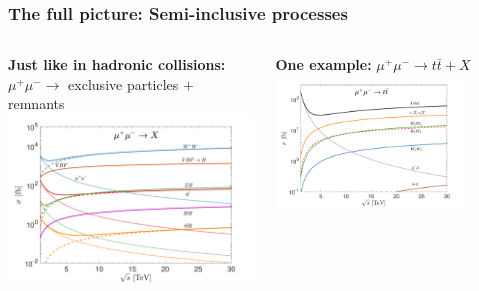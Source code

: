 \documentclass[aspectratio=169]{beamer}
\begin{document}
\begin{frame}
    \frametitle{The full picture: Semi-inclusive processes}
	\begin{columns}	
		\begin{column}{0.48\textwidth}
			\vspace{2mm}\hspace{3mm}\textcolor{PittRoyal}{\bf Just like in hadronic collisions:}\\
			$\mu^+\mu^-\to$ exclusive particles $+$ remnants
			\centering
			\includegraphics[width=1\textwidth]{figs/sigma_PDF2.pdf}\\
			\hspace{20mm}
		\end{column}
		\begin{column}{0.42\textwidth}
			\vspace{2mm}\hspace{3mm}\textcolor{PittRoyal}{\bf One example:}
			$\mu^+\mu^-\to t{\bar t}+X$
			\includegraphics[width=0.8\textwidth]{figs/sigma_tt.pdf}

\end{column}
\end{columns}
\end{frame}
\end{document}
